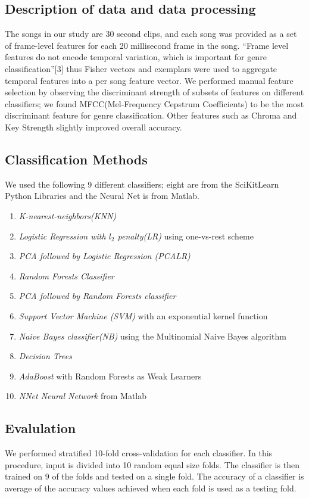 \documentclass{article}
\begin{document}
\subsection{Description of data and data processing}
The songs in our study are 30 second clips, and each song was provided as a set of frame-level features for each 20 millisecond frame in the song. ``Frame level features do not encode temporal variation, which is important for genre classification''[3] thus Fisher vectors and exemplars were used to aggregate temporal features into a per song feature vector. 
We performed manual feature selection by observing the discriminant strength of subsets of features on different classifiers; we found MFCC(Mel-Frequency Cepstrum Coefficients) to be the most discriminant feature for genre classification. Other features such as Chroma and Key Strength slightly improved overall accuracy.

\subsection{Classification Methods}
We used the following 9 different classifiers; eight are from the SciKitLearn Python Libraries and the Neural Net is from Matlab. 
\begin{enumerate}
    \item \textit{K-nearest-neighbors(KNN)} 
    \item \textit{Logistic Regression with $l_2$ penalty(LR)} using one-vs-rest scheme 
    \item \textit{PCA followed by Logistic Regression (PCALR)}
    \item \textit{Random Forests Classifier}
    \item \textit{PCA followed by Random Forests classifier}
    \item \textit{Support Vector Machine (SVM)} with an exponential kernel function
    \item \textit{Naive Bayes classifier(NB)} using the Multinomial Naive Bayes algorithm
    \item \textit{Decision Trees} 
    \item \textit{AdaBoost} with Random Forests as Weak Learners
    \item \textit{NNet Neural Network} from Matlab
\end{enumerate}
 
\subsection{Evalulation}
We performed stratified 10-fold cross-validation for each classifier. In this procedure, input is divided into 10 random equal size folds. The classifier is then trained on 9 of the folds and tested on a single fold. The accuracy of a classifier is average of the accuracy values achieved when each fold is used as a testing fold.
\end{document}
